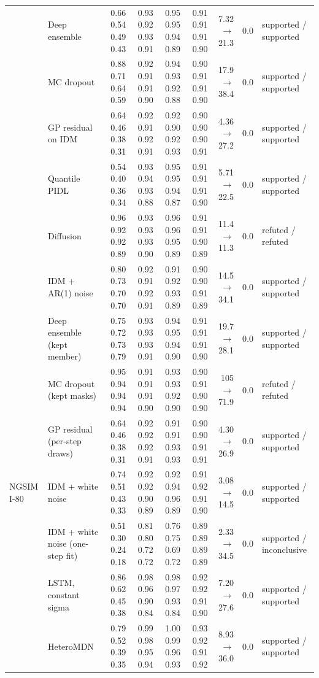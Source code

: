 \begin{longtable}{llrrrrrrl}
 & Deep ensemble & 0.66 0.54 0.49 0.43 & 0.93 0.92 0.93 0.91 & 0.95 0.95 0.94 0.89 & 0.91 0.91 0.91 0.90 & 7.32 $\rightarrow$ 21.3 & 0.0 & supported / supported \\
 & MC dropout & 0.88 0.71 0.64 0.59 & 0.92 0.91 0.91 0.90 & 0.94 0.93 0.92 0.88 & 0.90 0.91 0.91 0.90 & 17.9 $\rightarrow$ 38.4 & 0.0 & supported / supported \\
 & GP residual on IDM & 0.64 0.46 0.38 0.31 & 0.92 0.91 0.92 0.91 & 0.92 0.90 0.92 0.93 & 0.90 0.90 0.90 0.91 & 4.36 $\rightarrow$ 27.2 & 0.0 & supported / supported \\
 & Quantile PIDL & 0.54 0.40 0.36 0.34 & 0.93 0.94 0.93 0.88 & 0.95 0.95 0.94 0.87 & 0.91 0.91 0.91 0.90 & 5.71 $\rightarrow$ 22.5 & 0.0 & supported / supported \\
 & Diffusion & 0.96 0.92 0.92 0.89 & 0.93 0.93 0.93 0.90 & 0.96 0.96 0.95 0.89 & 0.91 0.91 0.90 0.89 & 11.4 $\rightarrow$ 11.3 & 0.0 & refuted / refuted \\
 & IDM + AR(1) noise & 0.80 0.73 0.70 0.70 & 0.92 0.91 0.92 0.91 & 0.91 0.92 0.93 0.89 & 0.90 0.90 0.91 0.89 & 14.5 $\rightarrow$ 34.1 & 0.0 & supported / supported \\
 & Deep ensemble (kept member) & 0.75 0.72 0.73 0.79 & 0.93 0.93 0.93 0.91 & 0.94 0.95 0.94 0.90 & 0.91 0.91 0.91 0.90 & 19.7 $\rightarrow$ 28.1 & 0.0 & supported / supported \\
 & MC dropout (kept masks) & 0.95 0.94 0.94 0.94 & 0.91 0.91 0.91 0.90 & 0.93 0.93 0.92 0.90 & 0.90 0.91 0.90 0.90 & 105 $\rightarrow$ 71.9 & 0.0 & refuted / refuted \\
 & GP residual (per-step draws) & 0.64 0.46 0.38 0.31 & 0.92 0.92 0.92 0.91 & 0.91 0.91 0.93 0.93 & 0.90 0.90 0.91 0.91 & 4.30 $\rightarrow$ 26.9 & 0.0 & supported / supported \\
\midrule
NGSIM I-80 & IDM + white noise & 0.74 0.51 0.43 0.33 & 0.92 0.92 0.90 0.89 & 0.92 0.94 0.96 0.89 & 0.91 0.92 0.91 0.90 & 3.08 $\rightarrow$ 14.5 & 0.0 & supported / supported \\
 & IDM + white noise (one-step fit) & 0.51 0.30 0.24 0.18 & 0.81 0.80 0.72 0.72 & 0.76 0.75 0.69 0.72 & 0.89 0.89 0.89 0.89 & 2.33 $\rightarrow$ 34.5 & 0.0 & supported / inconclusive \\
 & LSTM, constant sigma & 0.86 0.62 0.45 0.38 & 0.98 0.96 0.90 0.84 & 0.98 0.97 0.93 0.84 & 0.92 0.92 0.91 0.90 & 7.20 $\rightarrow$ 27.6 & 0.0 & supported / supported \\
 & HeteroMDN & 0.79 0.52 0.39 0.35 & 0.99 0.98 0.95 0.94 & 1.00 0.99 0.96 0.93 & 0.93 0.92 0.91 0.92 & 8.93 $\rightarrow$ 36.0 & 0.0 & supported / supported \\

\end{longtable}
